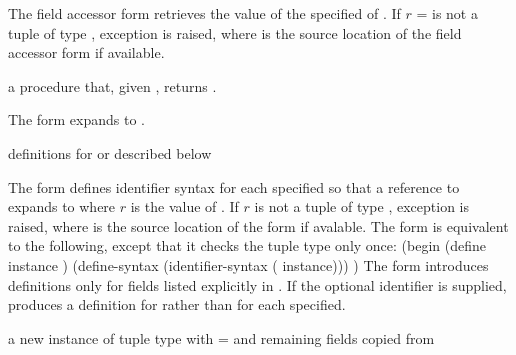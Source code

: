 The field accessor form retrieves the value of the specified
 of . If $r$ =  is not a tuple
of type , exception  is raised, where  is the source location of the
field accessor form if available.

\begin{syntax}
\end{syntax}
\returns{} a procedure that, given , returns .

The  form expands to .

\begin{syntax}
\end{syntax}
\expandsto{} definitions for  \etc{} or  \etc{} described below

The  form defines identifier syntax for each specified 
so that a reference to  expands to 
where $r$ is the value of .
If $r$ is not a tuple of type , exception
 is raised, where
 is the source location of the  form if avalable.
The  form is equivalent to the following, except that it
checks the tuple type only once:
\antipar\codebegin
(begin
  (define instance )
  (define-syntax  (identifier-syntax (  instance)))
  \etc{})
\codeend\antipar
The  form introduces definitions only for fields listed explicitly in .
If the optional  identifier is supplied,  produces
a definition for  rather than  for
each  specified.

\begin{syntax}
\end{syntax}
\returns{} a new instance of tuple type  with  =
 \etc{} and remaining fields copied from 

